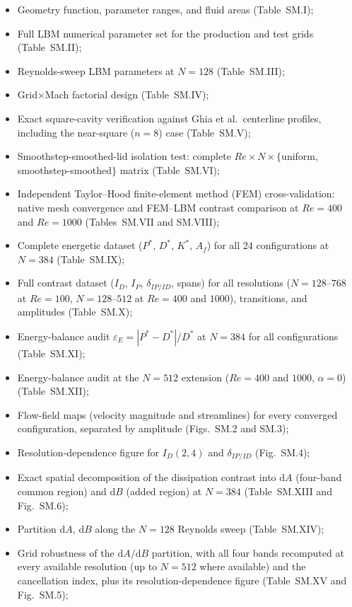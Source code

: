 \documentclass[aip,pof,reprint]{revtex4-2}
\begin{document}
\begin{itemize}
\item Geometry function, parameter ranges, and fluid areas (Table~SM.I);
\item Full LBM numerical parameter set for the production and test grids (Table~SM.II);
\item Reynolds-sweep LBM parameters at $N=128$ (Table~SM.III);
\item Grid$\times$Mach factorial design (Table~SM.IV);
\item Exact square-cavity verification against Ghia et al.\ centerline profiles, including the near-square ($n=8$) case (Table~SM.V);
\item Smoothstep-smoothed-lid isolation test: complete $Re\times N\times\{$uniform, smoothstep-smoothed$\}$ matrix (Table~SM.VI);
\item Independent Taylor--Hood finite-element method (FEM) cross-validation: native mesh convergence and FEM--LBM contrast comparison at $Re=400$ and $Re=1000$ (Tables~SM.VII and SM.VIII);
\item Complete energetic dataset ($P^*$, $D^*$, $K^*$, $A_f$) for all 24 configurations at $N=384$ (Table~SM.IX);
\item Full contrast dataset ($I_D$, $I_P$, $\delta_{IP/ID}$, spans) for all resolutions ($N=128$--$768$ at $Re=100$, $N=128$--$512$ at $Re=400$ and $1000$), transitions, and amplitudes (Table~SM.X);
\item Energy-balance audit $\varepsilon_E = |P^*-D^*|/D^*$ at $N=384$ for all configurations (Table~SM.XI);
\item Energy-balance audit at the $N=512$ extension ($Re=400$ and $1000$, $\alpha=0$) (Table~SM.XII);
\item Flow-field maps (velocity magnitude and streamlines) for every converged configuration, separated by amplitude (Figs.~SM.2 and SM.3);
\item Resolution-dependence figure for $I_D(2,4)$ and $\delta_{IP/ID}$ (Fig.~SM.4);
\item Exact spatial decomposition of the dissipation contrast into $\mathrm{d}A$ (four-band common region) and $\mathrm{d}B$ (added region) at $N=384$ (Table~SM.XIII and Fig.~SM.6);
\item Partition $\mathrm{d}A$, $\mathrm{d}B$ along the $N=128$ Reynolds sweep (Table~SM.XIV);
\item Grid robustness of the $\mathrm{d}A/\mathrm{d}B$ partition, with all four bands recomputed at every available resolution (up to $N=512$ where available) and the cancellation index, plus its resolution-dependence figure (Table~SM.XV and Fig.~SM.5);

\end{itemize}
\end{document}
